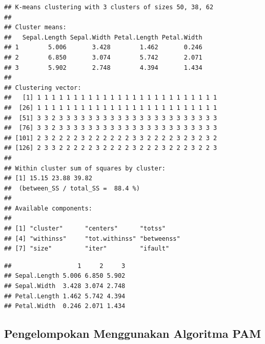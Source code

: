 \documentclass[]{book}
\newenvironment{Shaded}{\begin{snugshade}}{\end{snugshade}}
\newcommand{\CommentTok}[1]{\textcolor[rgb]{0.56,0.35,0.01}{\textit{#1}}}
\newcommand{\ControlFlowTok}[1]{\textcolor[rgb]{0.13,0.29,0.53}{\textbf{#1}}}
\newcommand{\KeywordTok}[1]{\textcolor[rgb]{0.13,0.29,0.53}{\textbf{#1}}}
\newcommand{\NormalTok}[1]{#1}
\newcommand{\OperatorTok}[1]{\textcolor[rgb]{0.81,0.36,0.00}{\textbf{#1}}}
\newcommand{\StringTok}[1]{\textcolor[rgb]{0.31,0.60,0.02}{#1}}
\theoremstyle{definition}
\theoremstyle{definition}
\theoremstyle{definition}
\theoremstyle{remark}
\begin{document}
\begin{verbatim}
## K-means clustering with 3 clusters of sizes 50, 38, 62
## 
## Cluster means:
##   Sepal.Length Sepal.Width Petal.Length Petal.Width
## 1        5.006       3.428        1.462       0.246
## 2        6.850       3.074        5.742       2.071
## 3        5.902       2.748        4.394       1.434
## 
## Clustering vector:
##   [1] 1 1 1 1 1 1 1 1 1 1 1 1 1 1 1 1 1 1 1 1 1 1 1 1 1
##  [26] 1 1 1 1 1 1 1 1 1 1 1 1 1 1 1 1 1 1 1 1 1 1 1 1 1
##  [51] 3 3 2 3 3 3 3 3 3 3 3 3 3 3 3 3 3 3 3 3 3 3 3 3 3
##  [76] 3 3 2 3 3 3 3 3 3 3 3 3 3 3 3 3 3 3 3 3 3 3 3 3 3
## [101] 2 3 2 2 2 2 3 2 2 2 2 2 2 3 3 2 2 2 2 3 2 3 2 3 2
## [126] 2 3 3 2 2 2 2 2 3 2 2 2 2 3 2 2 2 3 2 2 2 3 2 2 3
## 
## Within cluster sum of squares by cluster:
## [1] 15.15 23.88 39.82
##  (between_SS / total_SS =  88.4 %)
## 
## Available components:
## 
## [1] "cluster"      "centers"      "totss"       
## [4] "withinss"     "tot.withinss" "betweenss"   
## [7] "size"         "iter"         "ifault"
\end{verbatim}

\begin{Shaded}
\end{Shaded}

\begin{verbatim}
##                  1     2     3
## Sepal.Length 5.006 6.850 5.902
## Sepal.Width  3.428 3.074 2.748
## Petal.Length 1.462 5.742 4.394
## Petal.Width  0.246 2.071 1.434
\end{verbatim}

\hypertarget{pengelompokan-menggunakan-algoritma-pam}{%
\subsection{Pengelompokan Menggunakan Algoritma PAM}\label{pengelompokan-menggunakan-algoritma-pam}}
\end{document}
